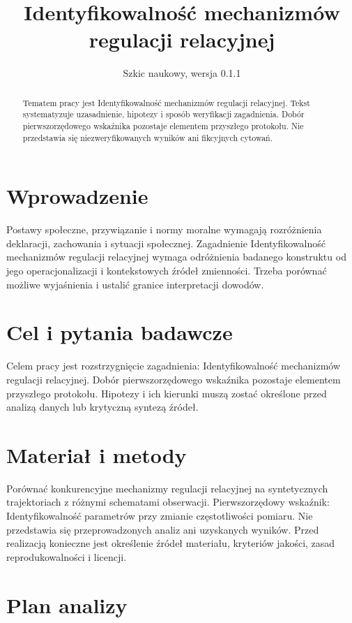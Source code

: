 \documentclass[11pt,a4paper]{article}
\title{Identyfikowalność mechanizmów regulacji relacyjnej}
\author{}
\date{Szkic naukowy, wersja 0.1.1}
\begin{document}
\maketitle

\begin{abstract}

Tematem pracy jest Identyfikowalność mechanizmów regulacji relacyjnej. Tekst systematyzuje uzasadnienie, hipotezy i sposób weryfikacji zagadnienia. Dobór pierwszorzędowego wskaźnika pozostaje elementem przyszłego protokołu. Nie przedstawia się niezweryfikowanych wyników ani fikcyjnych cytowań.

\end{abstract}

\section{Wprowadzenie}

Postawy społeczne, przywiązanie i normy moralne wymagają rozróżnienia deklaracji, zachowania i sytuacji społecznej. Zagadnienie Identyfikowalność mechanizmów regulacji relacyjnej wymaga odróżnienia badanego konstruktu od jego operacjonalizacji i kontekstowych źródeł zmienności. Trzeba porównać możliwe wyjaśnienia i ustalić granice interpretacji dowodów.

\section{Cel i pytania badawcze}

Celem pracy jest rozstrzygnięcie zagadnienia: Identyfikowalność mechanizmów regulacji relacyjnej. Dobór pierwszorzędowego wskaźnika pozostaje elementem przyszłego protokołu. Hipotezy i ich kierunki muszą zostać określone przed analizą danych lub krytyczną syntezą źródeł.

\section{Materiał i metody}

Porównać konkurencyjne mechanizmy regulacji relacyjnej na syntetycznych trajektoriach z różnymi schematami obserwacji. Pierwszorzędowy wskaźnik: Identyfikowalność parametrów przy zmianie częstotliwości pomiaru. Nie przedstawia się przeprowadzonych analiz ani uzyskanych wyników. Przed realizacją konieczne jest określenie źródeł materiału, kryteriów jakości, zasad reprodukowalności i licencji.

\section{Plan analizy}
\end{document}
